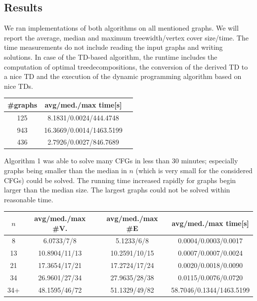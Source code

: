 \documentclass[11pt,a4paper]{article}
\begin{document}
\vspace*{-10mm}

\subsection{Results}

We ran implementations of both algorithms on all mentioned graphs. We will report the average, median and maximum treewidth/vertex cover size/time. The time measurements do not include reading the input graphs and writing solutions. In case of the TD-based algorithm, the runtime includes the computation of optimal treedecompositions, the conversion of the derived TD to a nice TD and the execution of the dynamic programming algorithm based on nice TDs. 

\begin{center}
\footnotesize
\begin{table}[h!]
\centering
\begin{tabular}{|c|c|c|}
\hline
\#graphs & avg/med./max time[s] \\
\hline \hline
125 & 8.1831/0.0024/444.4748 \\
\hline
943 & 16.3669/0.0014/1463.5199 \\
\hline
436 & 2.7926/0.0027/846.7689 \\
\hline
\end{tabular}
\end{table}
\end{center}

\vspace*{-7mm}

Algorithm 1 was able to solve many CFGs in less than 30 minutes; especially graphs being smaller than the median in $n$ (which is very small for the considered CFGs) could be solved. The running time increased rapidly for graphs begin larger than the median size. The largest graphs could not be solved within reasonable time. 

\begin{center}
\footnotesize
\begin{table}[h!]
\centering
\begin{tabular}{|c|c|c|c|}
\hline
$n$ & avg/med./max \#V. & avg/med./max \#E & avg/med./max time[s] \\
\hline \hline
8 & 6.0733/7/8 & 5.1233/6/8 & 0.0004/0.0003/0.0017  \\
\hline
13 & 10.8904/11/13 & 10.2591/10/15 & 0.0007/0.0007/0.0024 \\
\hline
21 & 17.3654/17/21 & 17.2724/17/24 & 0.0020/0.0018/0.0090 \\
\hline
34 & 26.9601/27/34 & 27.9635/28/38 & 0.0115/0.0076/0.0720  \\
\hline
34+ & 48.1595/46/72 & 51.1329/49/82 & 58.7046/0.1344/1463.5199  \\
\hline
\end{tabular}
\end{table}
\end{center}
\end{document}

